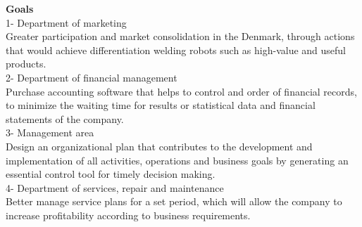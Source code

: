 \textbf{Goals}\\
1- Department of marketing\\
Greater participation and market consolidation in the Denmark, through actions that would achieve differentiation welding robots such as high-value and useful products.\\
2- Department of financial management\\
Purchase accounting software that helps to control and order of financial records, to minimize the waiting time for results or statistical data and financial statements of the company.\\
3- Management area\\
Design an organizational plan that contributes to the development and implementation of all activities, operations and business goals by generating an essential control tool for timely decision making.\\
4- Department of services, repair and maintenance\\
Better manage service plans for a set period, which will allow the company to increase profitability according to business requirements.

